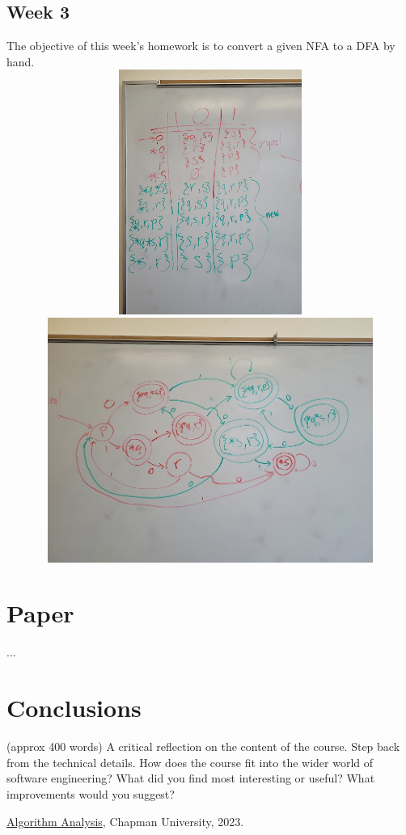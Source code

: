 \documentclass{article}
\theoremstyle{theorem}
\theoremstyle{definition}
\theoremstyle{remark}
\begin{document}
\subsection{Week 3}
The objective of this week's homework is to convert a given NFA to a DFA by hand.
\\ \includegraphics[width=15cm, height=8cm]{Report Images/HW3_1.jpg}
\\ \includegraphics[width=15cm, height=8cm]{Report Images/HW3_2.jpg}

\section{Paper}

...

\section{Conclusions}\label{conclusions}

(approx 400 words) A critical reflection on the content of the course. Step back from the technical details. How does the course fit into the wider world of software engineering? What did you find most interesting or useful? What improvements would you suggest?

\begin{thebibliography}{99}
 \href{https://github.com/alexhkurz/algorithm-analysis-2023}{Algorithm Analysis}, Chapman University, 2023.
\end{thebibliography}
\end{document}
